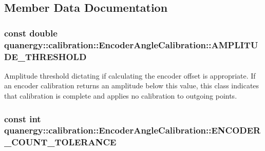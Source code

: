 \subsection{Member Data Documentation}
\hypertarget{structquanergy_1_1calibration_1_1EncoderAngleCalibration_a1b9a418e7547fb16216a839a0f605b47}{
\subsubsection[{A\-M\-P\-L\-I\-T\-U\-D\-E\-\_\-\-T\-H\-R\-E\-S\-H\-O\-L\-D}]{\setlength{\rightskip}{0pt plus 5cm}const double quanergy\-::calibration\-::\-Encoder\-Angle\-Calibration\-::\-A\-M\-P\-L\-I\-T\-U\-D\-E\-\_\-\-T\-H\-R\-E\-S\-H\-O\-L\-D\hspace{0.3cm}{\ttfamily [static]}}}\label{structquanergy_1_1calibration_1_1EncoderAngleCalibration_a1b9a418e7547fb16216a839a0f605b47}
Amplitude threshold dictating if calculating the encoder offset is appropriate. If an encoder calibration returns an amplitude below this value, this class indicates that calibration is complete and applies no calibration to outgoing points. \hypertarget{structquanergy_1_1calibration_1_1EncoderAngleCalibration_a78466d125a2b3c71199e06bb8f433738}{
\subsubsection[{E\-N\-C\-O\-D\-E\-R\-\_\-\-C\-O\-U\-N\-T\-\_\-\-T\-O\-L\-E\-R\-A\-N\-C\-E}]{\setlength{\rightskip}{0pt plus 5cm}const int quanergy\-::calibration\-::\-Encoder\-Angle\-Calibration\-::\-E\-N\-C\-O\-D\-E\-R\-\_\-\-C\-O\-U\-N\-T\-\_\-\-T\-O\-L\-E\-R\-A\-N\-C\-E\hspace{0.3cm}{\ttfamily [static]}}}\label{structquanergy_1_1calibration_1_1EncoderAngleCalibration_a78466d125a2b3c71199e06bb8f433738}
